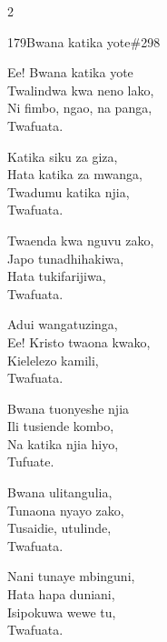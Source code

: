\documentclass{article}
\begin{document}
\begin{multicols}{2}
\begin{hymn}{179}{Bwana katika yote}{\#298}
\begin{stanza}
Ee! Bwana katika yote\\
Twalindwa kwa neno lako,\\
Ni fimbo, ngao, na panga,\\
Twafuata.
\end{stanza}
\begin{stanza}
Katika siku za giza,\\
Hata katika za mwanga,\\
Twadumu katika njia,\\
Twafuata.
\end{stanza}
\begin{stanza}
Twaenda kwa nguvu zako,\\
Japo tunadhihakiwa,\\
Hata tukifarijiwa,\\
Twafuata.
\end{stanza}
\begin{stanza}
Adui wangatuzinga,\\
Ee! Kristo twaona kwako,\\
Kielelezo kamili,\\
Twafuata.
\end{stanza}
\begin{stanza}
Bwana tuonyeshe njia\\
Ili tusiende kombo,\\
Na katika njia hiyo,\\
Tufuate.
\end{stanza}
\begin{stanza}
Bwana ulitangulia,\\
Tunaona nyayo zako,\\
Tusaidie, utulinde,\\
Twafuata.
\end{stanza}
\begin{stanza}
Nani tunaye mbinguni,\\
Hata hapa duniani,\\
Isipokuwa wewe tu,\\
Twafuata.
\end{stanza}
\end{hymn}


\end{multicols}
\end{document}
